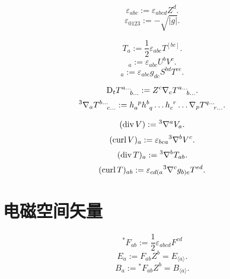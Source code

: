 \begin{equation}
    \varepsilon_{abc}:=\varepsilon_{abcd}Z^d.
\end{equation}
\begin{equation}
    \varepsilon_{0123}:=-\sqrt{\left\lvert g\right\rvert }.
\end{equation}

\begin{equation}
    T_a:=\frac{1}{2}\varepsilon_{abc}T^{[bc]}.
\end{equation}
\begin{equation}
    [U,V]_a:=\varepsilon_{abc}U^bV^c.
\end{equation}
\begin{equation}
    [S,T]_a:=\varepsilon_{abc}g_{de}S^{bd}T^{ce}.
\end{equation}

\begin{equation}
    \t{D}_tT^{a\dots}_{\ph{a\dots}b\dots}:=Z^c\nabla_c T^{a\dots}_{\ph{a\dots}b\dots}.
\end{equation}
\begin{equation}
    {}^3\nabla_a T^{b\dots}_{\ph{b\dots}c\dots}:=h_a^{\ph{a}p}h^b_{\ph{b}q}\dots h_c^{\ph{c}r}\dots\nabla_p T^{q\dots}_{\ph{q\dots}r\dots}.
\end{equation}

\begin{equation}
    (\text{div}\,V):={}^3\nabla^aV_a.
\end{equation}
\begin{equation}
    (\text{curl}\,V)_a:=\varepsilon_{bca}{}^3\nabla^bV^c.
\end{equation}
\begin{equation}
    (\text{div}\,T)_a:={}^3\nabla^bT_{ab}.
\end{equation}
\begin{equation}
    (\text{curl}\,T)_{ab}:=
    \varepsilon_{cd(a}{}^3\nabla^cg_{b)e}T^{ed}.
\end{equation}

\section{电磁空间矢量}

\begin{equation}
    {}^*\!F_{ab}:=\frac{1}{2}\varepsilon_{abcd}F^{cd}
\end{equation}
\begin{equation}
    E_a:=F_{ab}Z^b=E_{\langle a\rangle}.
\end{equation}
\begin{equation}
    B_a:={}^*\!F_{ab}Z^b=B_{\langle a\rangle}.
\end{equation}

